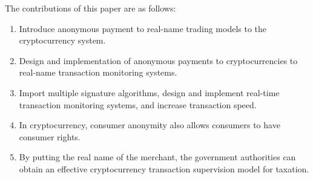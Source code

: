 \begin{eabstract}
	The contributions of this paper are as follows:
	\begin{enumerate}
		\item Introduce anonymous payment to real-name trading models to the cryptocurrency system.
		\item Design and implementation of anonymous payments to cryptocurrencies to real-name transaction monitoring systems.
		\item Import multiple signature algorithms, design and implement real-time transaction monitoring systems, and increase transaction speed.
		\item In cryptocurrency, consumer anonymity also allows consumers to have consumer rights.
		\item By putting the real name of the merchant, the government authorities can obtain an effective cryptocurrency transaction supervision model for taxation.
	\end{enumerate}



\end{eabstract}

